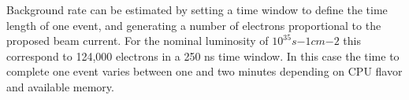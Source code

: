 Background rate can be estimated by setting a time window to define the time length of one event, and
generating a number of electrons proportional to the proposed beam current. For the nominal luminosity of $10^{35} s{-1}cm{-2}$
this correspond to 124,000 electrons in a 250 ns time window. In this case the time to complete one event varies
between one and two minutes depending on CPU flavor and available memory.


































